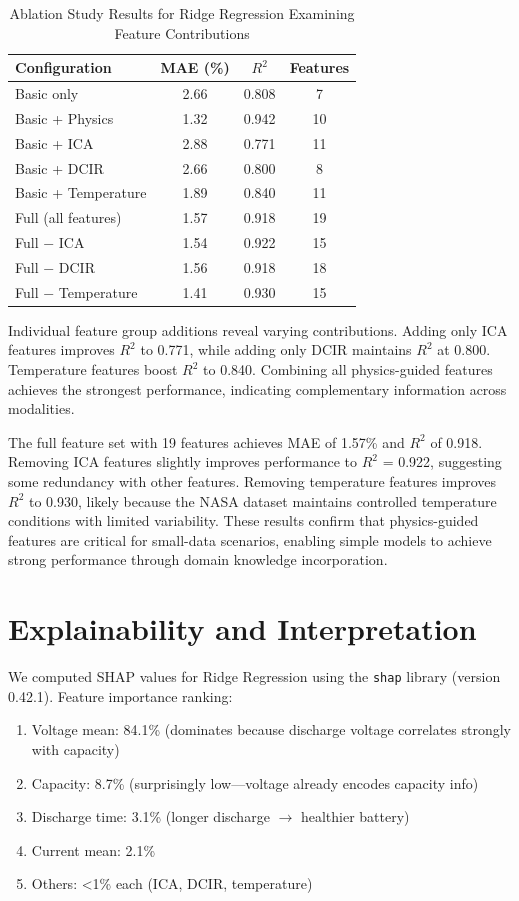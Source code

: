\documentclass{sn-jnl}
\begin{document}
\begin{table}[htbp]
\caption{Ablation Study Results for Ridge Regression Examining Feature Contributions}
\label{tab:ablation}
\centering
\small
\begin{tabular}{lccc}
\toprule
\textbf{Configuration} & \textbf{MAE (\%)} & \textbf{$R^2$} & \textbf{Features} \\
\midrule
Basic only & 2.66 & 0.808 & 7 \\
Basic + Physics & 1.32 & 0.942 & 10 \\
Basic + ICA & 2.88 & 0.771 & 11 \\
Basic + DCIR & 2.66 & 0.800 & 8 \\
Basic + Temperature & 1.89 & 0.840 & 11 \\
\midrule
Full (all features) & 1.57 & 0.918 & 19 \\
Full $-$ ICA & 1.54 & 0.922 & 15 \\
Full $-$ DCIR & 1.56 & 0.918 & 18 \\
Full $-$ Temperature & 1.41 & 0.930 & 15 \\
\bottomrule
\end{tabular}
\end{table}

Individual feature group additions reveal varying contributions. Adding only ICA features improves $R^2$ to 0.771, while adding only DCIR maintains $R^2$ at 0.800. Temperature features boost $R^2$ to 0.840. Combining all physics-guided features achieves the strongest performance, indicating complementary information across modalities.

The full feature set with 19 features achieves MAE of 1.57\% and $R^2$ of 0.918. Removing ICA features slightly improves performance to $R^2$ = 0.922, suggesting some redundancy with other features. Removing temperature features improves $R^2$ to 0.930, likely because the NASA dataset maintains controlled temperature conditions with limited variability. These results confirm that physics-guided features are critical for small-data scenarios, enabling simple models to achieve strong performance through domain knowledge incorporation.

\section{Explainability and Interpretation}
\label{sec:explainability}

We computed SHAP values for Ridge Regression using the \texttt{shap} library (version 0.42.1). Feature importance ranking:
\begin{enumerate}
\item Voltage mean: 84.1\% (dominates because discharge voltage correlates strongly with capacity)
\item Capacity: 8.7\% (surprisingly low—voltage already encodes capacity info)
\item Discharge time: 3.1\% (longer discharge $\rightarrow$ healthier battery)
\item Current mean: 2.1\%
\item Others: <1\% each (ICA, DCIR, temperature)
\end{enumerate}
\end{document}
